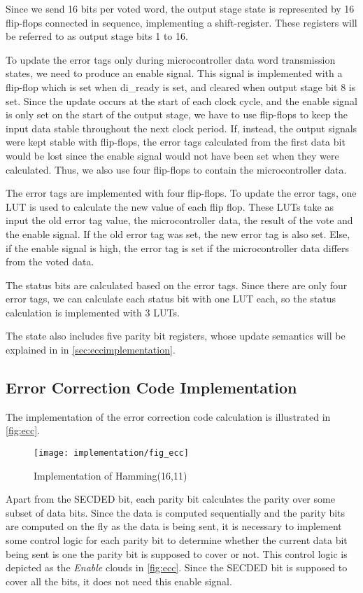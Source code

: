 Since we send 16 bits per voted word, the output stage state is
represented by 16 flip-flops connected in sequence, implementing a
shift-register. These registers will be referred to as output stage
bits 1 to 16. 

To update the error tags only during microcontroller data word
transmission states, we need to produce an enable signal. This signal
is implemented with a flip-flop which is set when {\ttfamily di\_ready} is set,
and cleared when output stage bit 8 is set. Since the update occurs at
the start of each clock cycle, and the enable signal is only set on
the start of the output stage, we have to use flip-flops to keep the
input data stable throughout the next clock period. If, instead, the
output signals were kept stable with flip-flops, the error tags
calculated from the first data bit would be lost since the enable
signal would not have been set when they were calculated. Thus, we
also use four flip-flops to contain the microcontroller data.

The error tags are implemented with four flip-flops. To update the
error tags, one LUT is used to calculate the new value of each flip
flop. These LUTs take as input the old error tag value, the
microcontroller data, the result of the vote and the enable
signal.  If the old error tag
was set, the new error tag is also set. Else, if the enable signal is
high, the error tag is set if the microcontroller data differs from
the voted data.

The status bits are calculated based on the error tags. Since there
are only four error tags, we can calculate each status bit with one
LUT each, so the status calculation is implemented with 3 LUTs. 

The state also includes five parity bit registers, whose update
semantics will be explained in in \autoref{sec:eccimplementation}.

\subsection{Error Correction Code Implementation}
\label{sec:eccimplementation}
The implementation of the error correction code calculation is
illustrated in \autoref{fig:ecc}. 

\begin{figure}
\texttt{[image: implementation/fig\_ecc]}
\caption{Implementation of Hamming(16,11)}
\label{fig:ecc}
\end{figure}

Apart from the SECDED bit, each parity bit calculates the parity over
some subset of data bits. Since the data is computed sequentially and
the parity bits are computed on the fly as the data is being sent, it
is necessary to implement some control logic for each parity bit to
determine whether the current data bit being sent is one the parity
bit is supposed to cover or not. This control logic is depicted as the
\textit{Enable} clouds in \autoref{fig:ecc}. Since the SECDED bit is
supposed to cover all the bits, it does not need this enable signal. 

